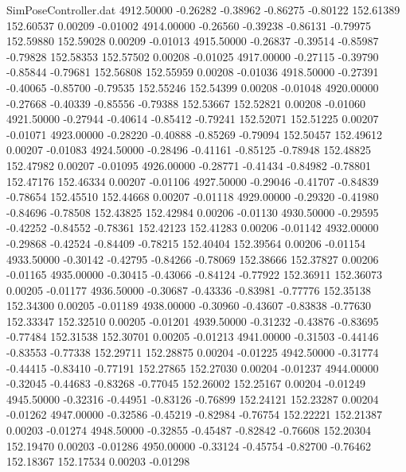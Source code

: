 \begin{filecontents}{SimPoseController.dat}
4912.50000   -0.26282   -0.38962    -0.86275   -0.80122  152.61389  152.60537    0.00209   -0.01002
4914.00000   -0.26560   -0.39238    -0.86131   -0.79975  152.59880  152.59028    0.00209   -0.01013
4915.50000   -0.26837   -0.39514    -0.85987   -0.79828  152.58353  152.57502    0.00208   -0.01025
4917.00000   -0.27115   -0.39790    -0.85844   -0.79681  152.56808  152.55959    0.00208   -0.01036
4918.50000   -0.27391   -0.40065    -0.85700   -0.79535  152.55246  152.54399    0.00208   -0.01048
4920.00000   -0.27668   -0.40339    -0.85556   -0.79388  152.53667  152.52821    0.00208   -0.01060
4921.50000   -0.27944   -0.40614    -0.85412   -0.79241  152.52071  152.51225    0.00207   -0.01071
4923.00000   -0.28220   -0.40888    -0.85269   -0.79094  152.50457  152.49612    0.00207   -0.01083
4924.50000   -0.28496   -0.41161    -0.85125   -0.78948  152.48825  152.47982    0.00207   -0.01095
4926.00000   -0.28771   -0.41434    -0.84982   -0.78801  152.47176  152.46334    0.00207   -0.01106
4927.50000   -0.29046   -0.41707    -0.84839   -0.78654  152.45510  152.44668    0.00207   -0.01118
4929.00000   -0.29320   -0.41980    -0.84696   -0.78508  152.43825  152.42984    0.00206   -0.01130
4930.50000   -0.29595   -0.42252    -0.84552   -0.78361  152.42123  152.41283    0.00206   -0.01142
4932.00000   -0.29868   -0.42524    -0.84409   -0.78215  152.40404  152.39564    0.00206   -0.01154
4933.50000   -0.30142   -0.42795    -0.84266   -0.78069  152.38666  152.37827    0.00206   -0.01165
4935.00000   -0.30415   -0.43066    -0.84124   -0.77922  152.36911  152.36073    0.00205   -0.01177
4936.50000   -0.30687   -0.43336    -0.83981   -0.77776  152.35138  152.34300    0.00205   -0.01189
4938.00000   -0.30960   -0.43607    -0.83838   -0.77630  152.33347  152.32510    0.00205   -0.01201
4939.50000   -0.31232   -0.43876    -0.83695   -0.77484  152.31538  152.30701    0.00205   -0.01213
4941.00000   -0.31503   -0.44146    -0.83553   -0.77338  152.29711  152.28875    0.00204   -0.01225
4942.50000   -0.31774   -0.44415    -0.83410   -0.77191  152.27865  152.27030    0.00204   -0.01237
4944.00000   -0.32045   -0.44683    -0.83268   -0.77045  152.26002  152.25167    0.00204   -0.01249
4945.50000   -0.32316   -0.44951    -0.83126   -0.76899  152.24121  152.23287    0.00204   -0.01262
4947.00000   -0.32586   -0.45219    -0.82984   -0.76754  152.22221  152.21387    0.00203   -0.01274
4948.50000   -0.32855   -0.45487    -0.82842   -0.76608  152.20304  152.19470    0.00203   -0.01286
4950.00000   -0.33124   -0.45754    -0.82700   -0.76462  152.18367  152.17534    0.00203   -0.01298

\end{filecontents}
